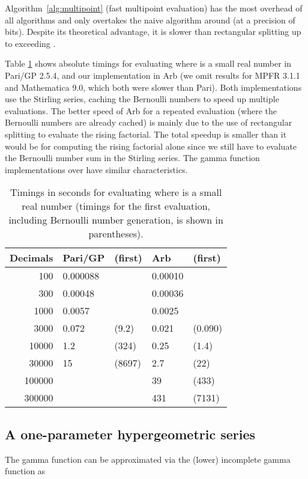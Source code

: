 \documentclass{sig-alternate}
\begin{document}
Algorithm~\ref{alg:multipoint} (fast multipoint evaluation)
has the most overhead of all algorithms and only overtakes
the naive algorithm around  (at a precision of  bits).
Despite its theoretical advantage, it is slower than rectangular splitting
up to  exceeding .

Table \ref{tab:gammatime} shows absolute timings for evaluating 
where  is a small real number in Pari/GP 2.5.4, and our implementation
in Arb (we omit results for MPFR 3.1.1 and Mathematica 9.0, which
both were slower than Pari).
Both implementations use the Stirling series, caching
the Bernoulli numbers to speed up multiple evaluations.
The better speed of Arb for a repeated evaluation (where the Bernoulli numbers
are already cached) is mainly due to the use of rectangular splitting
to evaluate the rising factorial.
The total speedup is smaller than it would be for computing the
rising factorial alone since we still have to evaluate the Bernoulli
number sum in the Stirling series.
The gamma function implementations
over  have similar characteristics.

\begin{table}[ht!] \label{tab:gammatime}
\centering
\begin{tabular}{r | l l l l}
Decimals & Pari/GP & (first) & Arb & (first) \\ \hline
100 & 0.000088 & & 0.00010 & \\
300 & 0.00048 & & 0.00036 & \\
1000 & 0.0057 & & 0.0025 & \\
3000 & 0.072 & (9.2) & 0.021 & (0.090) \\
10000 & 1.2 & (324) & 0.25 & (1.4) \\
30000 & 15 & (8697) & 2.7 & (22) \\
100000 &   & &  39 & (433) \\
300000 &   & &  431 & (7131) \\
\end{tabular}
\caption{Timings in seconds for evaluating 
where  is a small real number (timings for the first evaluation,
including Bernoulli number generation, is shown in parentheses).}
\end{table}

\subsection{A one-parameter hypergeometric series}

The gamma function can be approximated via the (lower)
incomplete gamma function as
\end{document}
